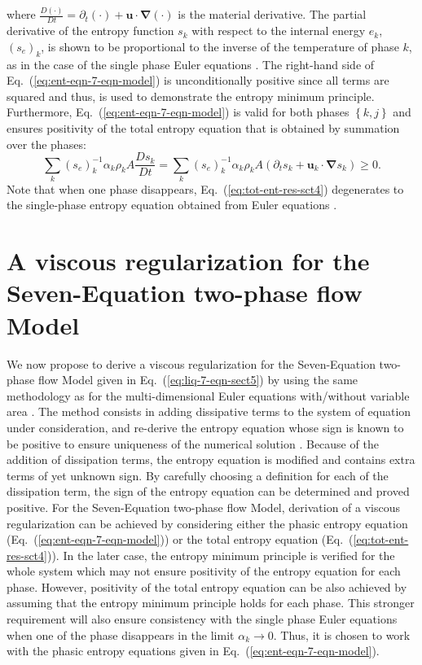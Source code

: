 \documentclass[preprint,10pt]{elsarticle}
\newcommand{\grad}{\mbold{\nabla}}
\newcommand{\mbold}[1]{\boldsymbol#1}
\newcommand{\eqt}[1]{Eq.~(\ref{#1})}                     %
\begin{document}
where $\frac{D(\cdot) }{Dt} = \partial_t (\cdot) + \mbold u \cdot \grad (\cdot)$ is the material derivative.
The partial derivative of the entropy function $s_k$ with respect to the internal energy $e_k$, $(s_e)_k$, is shown to be proportional to the inverse of the temperature of phase $k$, as in the case of the single phase Euler equations \cite{jlg, Marco_dissertation}. The right-hand side of \eqt{eq:ent-eqn-7-eqn-model} is unconditionally positive since all terms are squared and thus, is used to demonstrate the entropy minimum principle. Furthermore, \eqt{eq:ent-eqn-7-eqn-model} is valid for both phases $\left\{k, j\right\}$ and ensures positivity of the total entropy equation that is obtained by summation over the phases:
%
\begin{equation}\label{eq:tot-ent-res-sct4}
\sum_k (s_{e})_k^{-1} \alpha_k \rho_k A \frac{Ds_k}{Dt} = \sum_k (s_{e})_k^{-1} \alpha_k \rho_k A \left( \partial_t s_k + \mbold u_k \cdot \grad s_k \right) \geq 0  .
\end{equation}
%
Note that when one phase disappears, \eqt{eq:tot-ent-res-sct4} degenerates to the single-phase entropy equation obtained from Euler equations \cite{SEM, Marco_dissertation}.

\section{A viscous regularization for the Seven-Equation two-phase flow Model}\label{sec:visc-regu}
%
We now propose to derive a viscous regularization for the Seven-Equation two-phase flow Model given in \eqt{eq:liq-7-eqn-sect5} by using the same methodology as for the multi-dimensional Euler equations with/without variable area \cite{jlg, Marco_paper_low_mach}. The method consists in adding dissipative terms to the system of equation under consideration, and re-derive the entropy equation whose sign is known to be positive to ensure uniqueness of the numerical solution \cite{Leveque}. Because of the addition of dissipation terms, the entropy equation is modified and contains extra terms of yet unknown sign. By carefully choosing a definition for each of the dissipation term, the sign of the entropy equation can be determined and proved positive. For the Seven-Equation two-phase flow Model, derivation of a viscous regularization can be achieved by considering either the phasic entropy equation (\eqt{eq:ent-eqn-7-eqn-model}) or the total entropy equation (\eqt{eq:tot-ent-res-sct4}). In the later case, the entropy minimum principle is verified for the whole system which may not ensure positivity of the entropy equation for each phase. However, positivity of the total entropy equation can be also achieved by assuming that the entropy minimum principle holds for each phase. This stronger requirement will also ensure consistency with the single phase Euler equations when one of the phase disappears in the limit $\alpha_k \to 0$. Thus, it is chosen to work with the phasic entropy equations given in \eqt{eq:ent-eqn-7-eqn-model}.
\end{document}
